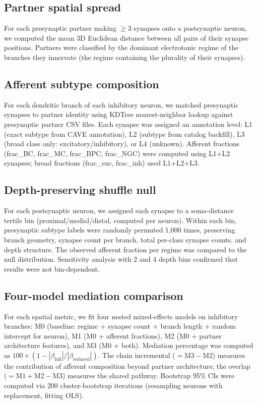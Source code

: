 \documentclass[11pt]{article}
\begin{document}
\subsection{Partner spatial spread}

For each presynaptic partner making $\geq 3$ synapses onto a postsynaptic neuron, we computed the mean 3D Euclidean distance between all pairs of their synapse positions. Partners were classified by the dominant electrotonic regime of the branches they innervate (the regime containing the plurality of their synapses).

\subsection{Afferent subtype composition}

For each dendritic branch of each inhibitory neuron, we matched presynaptic synapses to partner identity using KDTree nearest-neighbor lookup against presynaptic partner CSV files. Each synapse was assigned an annotation level: L1 (exact subtype from CAVE annotation), L2 (subtype from catalog backfill), L3 (broad class only: excitatory/inhibitory), or L4 (unknown). Afferent fractions (frac\_BC, frac\_MC, frac\_BPC, frac\_NGC) were computed using L1+L2 synapses; broad fractions (frac\_exc, frac\_inh) used L1+L2+L3.

\subsection{Depth-preserving shuffle null}

For each postsynaptic neuron, we assigned each synapse to a soma-distance tertile bin (proximal/medial/distal, computed per neuron). Within each bin, presynaptic subtype labels were randomly permuted 1,000 times, preserving branch geometry, synapse count per branch, total per-class synapse counts, and depth structure. The observed afferent fraction per regime was compared to the null distribution. Sensitivity analysis with 2 and 4 depth bins confirmed that results were not bin-dependent.

\subsection{Four-model mediation comparison}

For each spatial metric, we fit four nested mixed-effects models on inhibitory branches: M0 (baseline: regime $+$ synapse count $+$ branch length $+$ random intercept for neuron), M1 (M0 $+$ afferent fractions), M2 (M0 $+$ partner architecture features), and M3 (M0 $+$ both). Mediation percentage was computed as $100 \times (1 - |\beta_{\text{full}}| / |\beta_{\text{reduced}}|)$. The chain incremental ($= \text{M3} - \text{M2}$) measures the contribution of afferent composition beyond partner architecture; the overlap ($= \text{M1} + \text{M2} - \text{M3}$) measures the shared pathway. Bootstrap 95\% CIs were computed via 200 cluster-bootstrap iterations (resampling neurons with replacement, fitting OLS).
\end{document}
